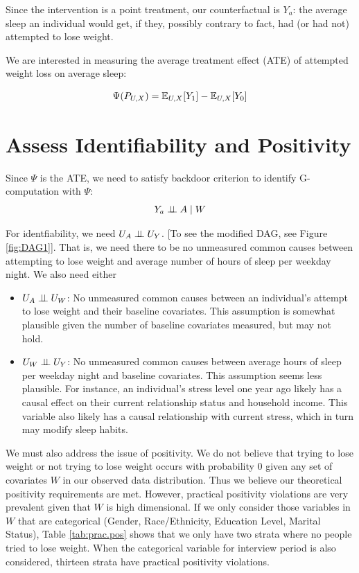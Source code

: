 \documentclass{article}
\begin{document}
Since the intervention is a point treatment, our counterfactual is $Y_{a}$: the average sleep an individual would get, if they, possibly contrary to fact, had (or had not) attempted to lose weight.

We are interested in measuring the average treatment effect (ATE) of attempted weight loss on average sleep:

$$\Psi(P_{U,X}) = \mathbb{E}_{U,X}[Y_1] - \mathbb{E}_{U,X}[Y_0]$$

\section{Assess Identifiability and Positivity}
\label{sec:assumptions}

Since $\Psi$ is the ATE, we need to satisfy backdoor criterion to identify G-computation with $\Psi$:
   $$Y_{a} \perp\hspace{-5pt}\perp A \mid W$$

For identfiability, we need $U_{A} \perp\hspace{-5pt}\perp U_{Y}$. [To see the modified DAG, see Figure \ref{fig:DAG1}].  That is, we need there to be no unmeasured common causes between attempting to lose weight and average number of hours of sleep per weekday night. We also need either 
    \begin{itemize}
      \item $U_{A} \perp\hspace{-5pt}\perp U_{W}$: No unmeasured common causes between an individual's attempt to lose weight and their baseline covariates. This assumption is somewhat plausible given the number of baseline covariates measured, but may not hold.
      \item $U_{W} \perp\hspace{-5pt}\perp U_{Y}$: No unmeasured common causes between average hours of sleep per weekday night and baseline covariates. This assumption seems less plausible. For instance, an individual's stress level one year ago likely has a causal effect on their current relationship status and household income. This variable also likely has a causal relationship with current stress, which in turn may modify sleep habits.
    \end{itemize}

We must also address the issue of positivity.  We do not believe that trying to lose weight or not trying to lose weight occurs with probability $0$ given any set of covariates $W$ in our observed data distribution.  Thus we believe our theoretical positivity requirements are met.  However, practical positivity violations are very prevalent given that $W$ is high dimensional.  If we only consider those variables in $W$ that are categorical (Gender, Race/Ethnicity, Education Level, Marital Status), Table \ref{tab:prac.pos} shows that we only have two strata where no people tried to lose weight. When the categorical variable for interview period is also considered, thirteen strata have practical positivity violations.
\end{document}
